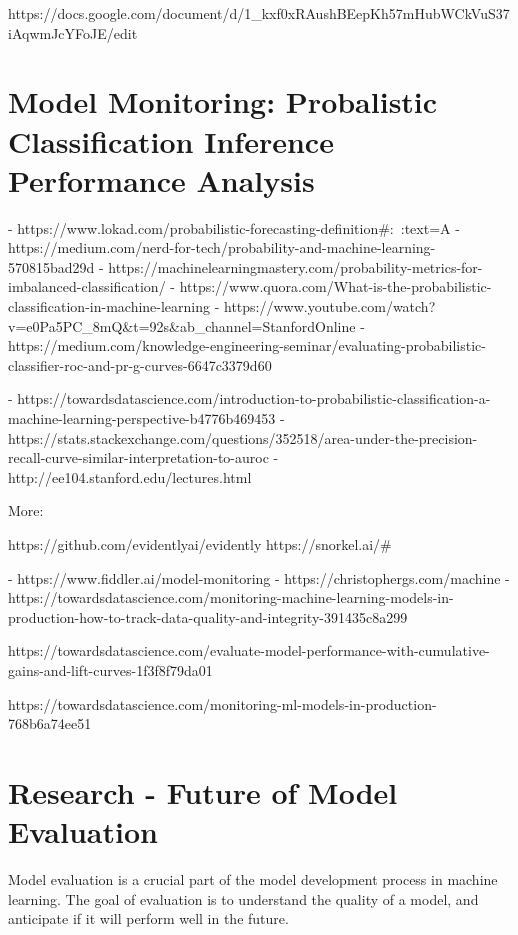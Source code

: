 \documentclass[openany]{book}
\begin{document}
https://docs.google.com/document/d/1_kxf0xRAushBEepKh57mHubWCkVuS37iAqwmJcYFoJE/edit



\section{Model Monitoring: Probalistic Classification Inference Performance  Analysis}


- https://www.lokad.com/probabilistic-forecasting-definition#:~:text=A%
- https://medium.com/nerd-for-tech/probability-and-machine-learning-570815bad29d
- https://machinelearningmastery.com/probability-metrics-for-imbalanced-classification/
- https://www.quora.com/What-is-the-probabilistic-classification-in-machine-learning
- https://www.youtube.com/watch?v=e0Pa5PC_8mQ&t=92s&ab_channel=StanfordOnline
- https://medium.com/knowledge-engineering-seminar/evaluating-probabilistic-classifier-roc-and-pr-g-curves-6647c3379d60

- https://towardsdatascience.com/introduction-to-probabilistic-classification-a-machine-learning-perspective-b4776b469453
- https://stats.stackexchange.com/questions/352518/area-under-the-precision-recall-curve-similar-interpretation-to-auroc
- http://ee104.stanford.edu/lectures.html

More:

https://github.com/evidentlyai/evidently
https://snorkel.ai/#

- https://www.fiddler.ai/model-monitoring
- https://christophergs.com/machine%
- https://towardsdatascience.com/monitoring-machine-learning-models-in-production-how-to-track-data-quality-and-integrity-391435c8a299 

https://towardsdatascience.com/evaluate-model-performance-with-cumulative-gains-and-lift-curves-1f3f8f79da01

https://towardsdatascience.com/monitoring-ml-models-in-production-768b6a74ee51




\section{Research - Future of Model Evaluation}

Model evaluation is a crucial part of the model development process in machine learning. The goal of evaluation is to understand the quality of a model, and anticipate if it will perform well in the future.
\end{document}
